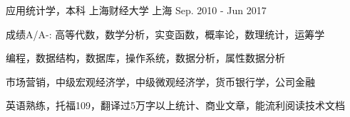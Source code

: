 

\begin{cventries}

  \cventry
    {应用统计学，本科} %
    {上海财经大学} %
    {上海} %
    {Sep. 2010 - Jun 2017} %
    {
      \begin{cvitems} %
        \item {成绩A/A-:   高等代数，数学分析，实变函数，概率论，数理统计，运筹学}
        \item {编程，数据结构，数据库，操作系统，数据分析，属性数据分析}
        \item {市场营销，中级宏观经济学，中级微观经济学，货币银行学，公司金融}
        \item {英语熟练，托福109，翻译过5万字以上统计、商业文章，能流利阅读技术文档}
      \end{cvitems}
    }

\end{cventries}
